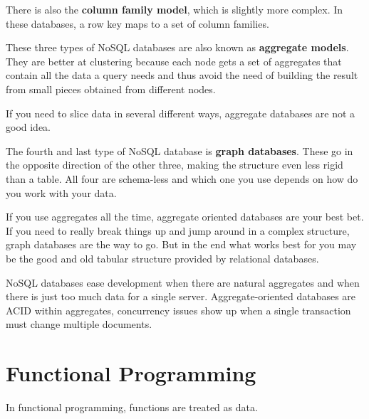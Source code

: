 \documentclass[oneside]{book} %
\theoremstyle{plain}
\begin{document}
There is also the \textbf{column family model}, which is slightly more complex.
In these databases, a row key maps to a set of column families.

These three types of NoSQL databases are also known as \textbf{aggregate
models}. They are better at clustering because each node gets a set of
aggregates that contain all the data a query needs and thus avoid the need of
building the result from small pieces obtained from different nodes.

If you need to slice data in several different ways, aggregate databases are not
a good idea.

The fourth and last type of NoSQL database is \textbf{graph databases}. These go
in the opposite direction of the other three, making the structure even less
rigid than a table. All four are schema-less and which one you use depends on
how do you work with your data.

If you use aggregates all the time, aggregate oriented databases are your best
bet. If you need to really break things up and jump around in a complex
structure, graph databases are the way to go. But in the end what works best for
you may be the good and old tabular structure provided by relational databases.

NoSQL databases ease development when there are natural aggregates and when
there is just too much data for a single server.
Aggregate-oriented databases are ACID within aggregates, concurrency issues show
up when a single transaction must change multiple documents.

\chapter{Functional Programming}
In functional programming, functions are treated as data.
\end{document}
